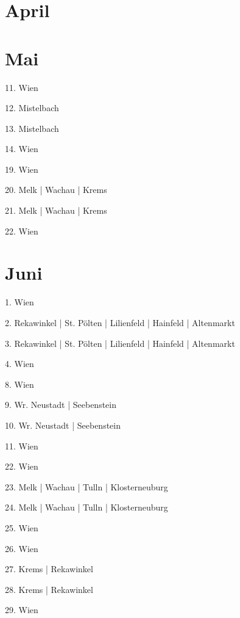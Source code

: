 \documentclass[twoside=false,titlepage=false,open=any, parskip=never, fontsize=10pt, headings=small, chapterprefix=false, appendixprefix=false, DIV=15]{scrbook}
\begin{document}
\begin{multicols}{3}
            \section*{April}
            \section*{Mai}
            11. Wien\par
            12. Mistelbach\par
            13. Mistelbach\par
            14. Wien\par
            19. Wien\par
            20. Melk | Wachau | Krems\par
            21. Melk | Wachau | Krems\par
            22. Wien\par
            \section*{Juni}
            1. Wien\par
            2. Rekawinkel | St. Pölten | Lilienfeld | Hainfeld | Altenmarkt\par
            3. Rekawinkel | St. Pölten | Lilienfeld | Hainfeld | Altenmarkt\par
            4. Wien\par
            8. Wien\par
            9. Wr. Neustadt | Seebenstein\par
            10. Wr. Neustadt | Seebenstein\par
            11. Wien\par
            22. Wien\par
            23. Melk | Wachau | Tulln | Klosterneuburg\par
            24. Melk | Wachau | Tulln | Klosterneuburg\par
            25. Wien\par
            26. Wien\par
            27. Krems | Rekawinkel\par
            28. Krems | Rekawinkel\par
            29. Wien\par

\end{multicols}
\end{document}
